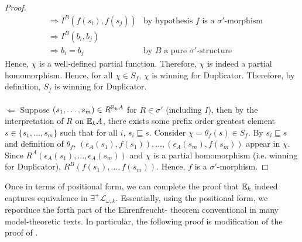\begin{thm}
\begin{proof}
\begin{align*}
&\Rightarrow I^{B}(f(s_{i}),f(s_{j})) & \text{by hypothesis $f$ is a $\sigma'$-morphism} \\
&\Rightarrow I^{B}(b_{i},b_{j}) \\
&\Rightarrow b_{i} = b_{j} & \text{by $B$ a pure $\sigma'$-structure}
\end{align*}
Hence, $\chi$ is a well-defined partial function.
Therefore, $\chi$ is indeed a partial homomorphism. Hence, for all $\chi \in S_{f}$, $\chi$ is winning for Duplicator. Therefore, by definition, $S_{f}$ is winning for Duplicator.
\\~\\
$\Leftarrow$ Suppose $(s_{1},\dots,s_{m}) \in R^{{\mathbb{E}_{k}A}}$ for $R \in \sigma'$ (including $I$), then by the interpretation of $R$ on ${\mathbb{E}_{k}A}$, there exists some prefix order greatest element $s \in \{s_{1},\dots,s_{m}\}$ such that for all $i$, $s_{i} \sqsubseteq s$. Consider $\chi = \theta_{f}(s) \in S_{f}$. By $s_{i} \sqsubseteq s$ and definition of $\theta_{f}$, $(\epsilon_{A}(s_{1}),f(s_{1})),\dots, (\epsilon_{A}(s_{m}),f(s_{m}))$ appear in $\chi$. Since $R^{A}(\epsilon_{A}(s_{1}),\dots,\epsilon_{A}(s_{m}))$ and $\chi$ is a partial homomorphism (i.e. winning for Duplicator), $R^{B}(f(s_{1}),\dots,f(s_{m}))$. Hence, $f$ is a $\sigma'$-morphism.
\end{proof}
\label{thm:toPositionalFormEF}
\end{thm}
Once in terms of positional form, we can complete the proof that ${\mathbb{E}_{k}}$ indeed captures equivalence in $\exists^{+}\mathcal{L}_{\omega,k}$. Essentially, using the positional form, we reporduce the forth part of the Ehrenfreucht-{\Fraisse} theorem conventional in many model-theoretic texts. In particular, the following proof is modification of the proof of \cite[Theorem 3.18]{Libkin2004}. 
